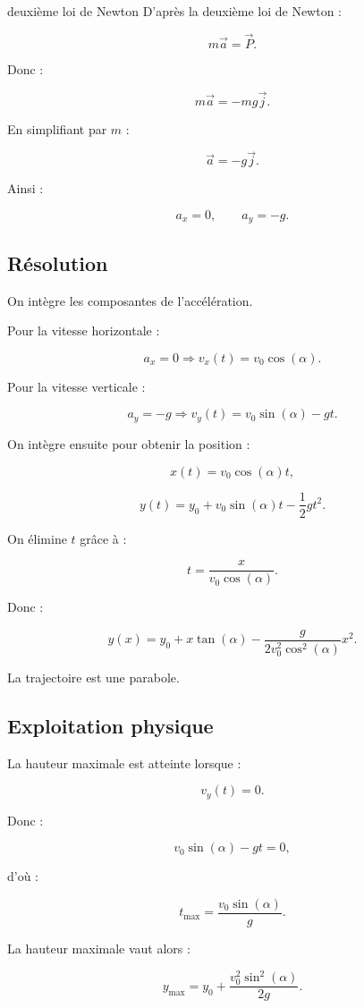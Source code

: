 \documentclass[11pt,a4paper]{article}
\begin{document}
\begin{equationbox}{deuxième loi de Newton}
D'après la deuxième loi de Newton :

\[
m\vec{a}=\vec{P}.
\]

Donc :

\[
m\vec{a}=-mg\vec{j}.
\]

En simplifiant par $m$ :

\[
\vec{a}=-g\vec{j}.
\]

Ainsi :

\[
a_x=0,
\qquad
a_y=-g.
\]
\end{equationbox}

\subsection{Résolution}

On intègre les composantes de l'accélération.

Pour la vitesse horizontale :

\[
a_x=0
\Rightarrow
v_x(t)=v_0\cos(\alpha).
\]

Pour la vitesse verticale :

\[
a_y=-g
\Rightarrow
v_y(t)=v_0\sin(\alpha)-gt.
\]

On intègre ensuite pour obtenir la position :

\[
x(t)=v_0\cos(\alpha)t,
\]

\[
y(t)=y_0+v_0\sin(\alpha)t-\frac12gt^2.
\]

On élimine $t$ grâce à :

\[
t=\frac{x}{v_0\cos(\alpha)}.
\]

Donc :

\[
y(x)=y_0+x\tan(\alpha)-\frac{g}{2v_0^2\cos^2(\alpha)}x^2.
\]

La trajectoire est une parabole.

\subsection{Exploitation physique}

La hauteur maximale est atteinte lorsque :

\[
v_y(t)=0.
\]

Donc :

\[
v_0\sin(\alpha)-gt=0,
\]

d'où :

\[
t_{\max}=\frac{v_0\sin(\alpha)}{g}.
\]

La hauteur maximale vaut alors :

\[
y_{\max}
=
y_0+\frac{v_0^2\sin^2(\alpha)}{2g}.
\]
\end{document}
